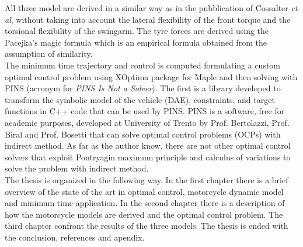 All three model are derived in a similar way as in the pubblication of Cossalter \textit{et al}\cite{cossalter2007influence}, without taking into account the lateral flexibility of the front torque and the torsional flexibility of the swingarm. The tyre forces are derived using the Pacejka's magic formula \cite{pacejka2006tyre} which is an empirical formula obtained from the assumption of similarity.\\
The minimum time trajectory and control is computed formulating a custom optimal control problem using XOptima package for Maple and then solving with PINS (acronym for \textit{PINS Is Not a Solver}). The first is a library developed to transform the symbolic model of the vehicle (DAE), constraints, and target functions in C++ code that can be used by PINS. PINS is a software, free for academic purposes, developed at University of Trento by Prof. Bertolazzi, Prof. Biral and Prof. Bosetti that can solve optimal control problems (OCPs) with indirect method. As far as the author know, there are not other optimal control solvers that exploit Pontryagin maximum principle and calculus of variations to solve the problem with indirect method. \cite{bertolazzi2006symbolic}\\
The thesis is organized in the following way. 
In the first chapter there is a brief overview of the state of the art in optimal control, motorcycle dynamic model and minimum time application.
In the second chapter there is a description of how the motorcycle models are derived and the optimal control problem.
The third chapter confront the results of the three models.
The thesis is ended with the conclusion, references and apendix.
